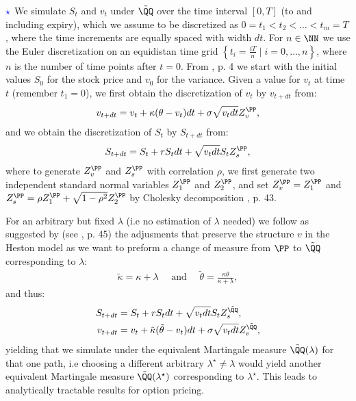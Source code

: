 \documentclass[11pt]{article}
\numberwithin{equation}{section}
\newcommand{\lc}{\left\{}
\newcommand{\rc}{\right\}}
\begin{document}
$\textcolor{blue}{\star}$ We simulate $S_t$ and $v_t$ under $\tilde{\QQ}$ over the time interval $[0, T]$ (to
and including expiry),
which we assume to be discretized as $0 = t_1 < t_2 < \ldots < t_m = T$, where
the time increments are equally spaced with width $d t$. For $n\in\NN$ we use
the Euler discretization on an equidistan time grid $\lc t_i=\frac{iT}{n}\mid
i=0,\ldots,n\rc$, where $n$ is the number of time points after $t=0$. From
\cite{Rouah2024}, p. 4 we start with the initial
values $S_0$ for the stock price and $v_0$ for the variance. Given a value for
$v_t$ at time $t$ (remember $t_1=0$), we first obtain the discretization of $v_t$ by $v_{t+dt}$ from:
\begin{align*}
    v_{t+dt} = v_t + \kappa(\theta - v_t)dt + \sigma \sqrt{v_t dt}Z_v^\PP,
\end{align*}
and we obtain the discretization of $S_t$ by $S_{t+dt}$ from:
\begin{align*}
    S_{t+dt} = S_t + rS_tdt + \sqrt{v_t dt}S_tZ_s^\PP,
\end{align*}
where to generate $Z_v^\PP$ and $Z_s^\PP$ with correlation $\rho$, we first generate two
independent standard normal variables $Z_1^\PP$ and $Z_2^\PP$, and set $Z_v^\PP = Z_1^\PP$ and
$Z_s^\PP = \rho Z_1^\PP + \sqrt{1 - \rho^2} Z_2^\PP$ by Cholesky decomposition
\cite{Havrylenko2024}, p. 43.

For an arbitrary but fixed $\lambda$ (i.e no estimation of $\lambda$ needed) we
follow as suggested by \cite{heston1993closed} (see \cite{Havrylenko2024}, p.
45) the adjusments that preserve the structure $v$ in the Heston model as we
want to preform a change of measure from $\PP$ to $\tilde{\QQ}$ corresponding to
$\lambda$:
\begin{align*}
    \tilde{\kappa}=\kappa+\lambda \quad \text{ and } \quad \tilde{\theta}=\frac{\kappa\theta}{\kappa + \lambda},
\end{align*}
and thus:
\begin{align*}
    S_{t+dt} &= S_t + rS_tdt + \sqrt{v_t dt}S_tZ_s^{\tilde{\QQ}},\\
    v_{t+dt} &= v_t +\tilde{\kappa}(\tilde{\theta} - v_t)dt + \sigma \sqrt{v_t dt}Z_v^{\tilde{\QQ}},
\end{align*}
yielding that we simulate under the equivalent Martingale measure
$\tilde{\QQ}(\lambda)$ for that one path, i.e choosing a different arbitrary
$\lambda^\star \neq \lambda$ would yield another equivalent Martingale measure
$\tilde{\QQ}(\lambda^\star)$ corresponding to $\lambda^\star$. This leads
to analytically tractable results for option pricing.
\end{document}
